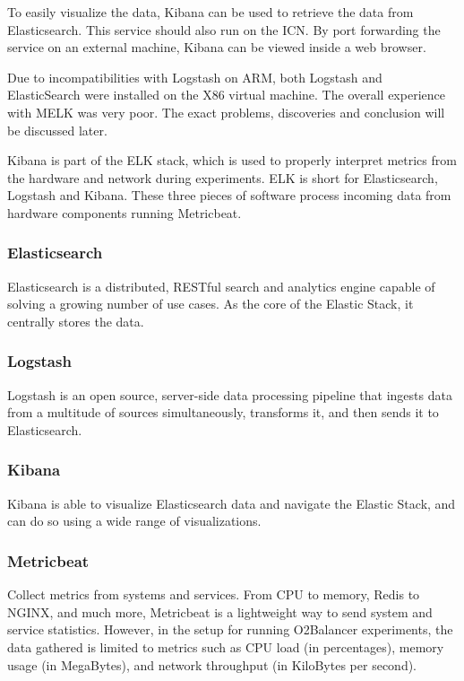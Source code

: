 \documentclass[]{article}
\begin{document}
To easily visualize the data, Kibana can be used to retrieve the data from Elasticsearch. This service should also run on the ICN. By port forwarding the service on an external machine, Kibana can be viewed inside a web browser.

Due to incompatibilities with Logstash on ARM, both Logstash and ElasticSearch were installed on the X86 virtual machine. The overall experience with MELK was very poor. The exact problems, discoveries and conclusion will be discussed later.

Kibana is part of the ELK stack, which is used to properly interpret metrics from the hardware and network during experiments. ELK is short for Elasticsearch, Logstash and Kibana. These three pieces of software process incoming data from hardware components running Metricbeat.

\subsubsection{Elasticsearch}
Elasticsearch is a distributed, RESTful search and analytics engine capable of solving a growing number of use cases. As the core of the Elastic Stack, it centrally stores the data.

\subsubsection{Logstash}
Logstash is an open source, server-side data processing pipeline that ingests data from a multitude of sources simultaneously, transforms it, and then sends it to Elasticsearch.

\subsubsection{Kibana}
Kibana is able to visualize Elasticsearch data and navigate the Elastic Stack, and can do so using a wide range of visualizations.

\subsubsection{Metricbeat}
Collect metrics from systems and services. From CPU to memory, Redis to NGINX, and much more, Metricbeat is a lightweight way to send system and service statistics. However, in the setup for running O2Balancer experiments, the data gathered is limited to metrics such as CPU load (in percentages), memory usage (in MegaBytes), and network throughput (in KiloBytes per second).
\end{document}
